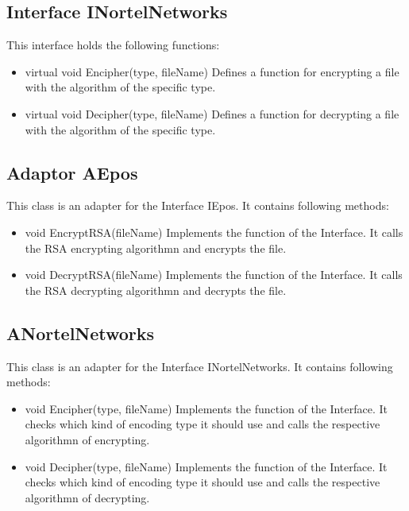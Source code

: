 \subsection{Interface INortelNetworks}
This interface holds the following functions:
\begin{itemize}
\item virtual  void Encipher(type, fileName)
\subitem Defines a function for encrypting a file with the algorithm of the specific type.
\item virtual void Decipher(type, fileName)
\subitem Defines a function for decrypting a file with the algorithm of the specific type.
\end{itemize}

\subsection{Adaptor AEpos}
This class is an adapter for the Interface IEpos. It contains following methods:
\begin{itemize}
\item void EncryptRSA(fileName)
\subitem Implements the function of the Interface. It calls the RSA encrypting algorithmn and encrypts the file.
\item void DecryptRSA(fileName)
\subitem Implements the function of the Interface. It calls the RSA decrypting algorithmn and decrypts the file.
\end{itemize}

\subsection{ANortelNetworks}
This class is an adapter for the Interface INortelNetworks. It contains following methods:
\begin{itemize}
\item void Encipher(type, fileName)
\subitem Implements the function of the Interface. It checks which kind of encoding type it should use and calls
the respective algorithmn of encrypting.
\item void Decipher(type, fileName)
\subitem Implements the function of the Interface. It checks which kind of encoding type it should use and calls
the respective algorithmn of decrypting.
\end{itemize}

